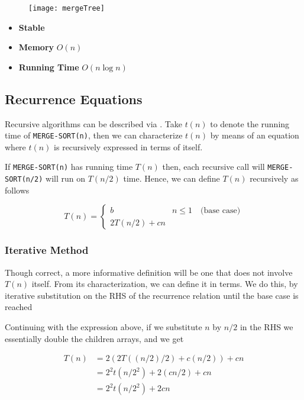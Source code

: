 \begin{figure}[H]
	\texttt{[image: mergeTree]}
\end{figure}

\begin{itemize}
	\item\textbf{Stable}
	\item\textbf{Memory} $O(n)$
	\item\textbf{Running Time} $O(n \log n)$
\end{itemize}

\subsection{Recurrence Equations}


	

\par{Recursive algorithms can be described via . Take
$t(n)$ to denote the  running time of \texttt{MERGE-SORT(n)},
then we can characterize $t(n)$ by means of an equation where $t(n)$ is
recursively expressed in terms of itself.
}
\par{If \texttt{MERGE-SORT(n)} has running time $T(n)$ then, each recursive call
will \texttt{MERGE-SORT(n/2)} will run on $T(n/2)$ time. Hence, we can define
$T(n)$ recursively as follows}

$$ T(n) = \left\{ 
	\begin{array}{ll}
		b & n \leq 1 \quad \text{(base case)} \\
		2T(n/2) + cn 
	\end{array}
\right.
$$
\subsubsection{Iterative Method}
\par{Though correct, a more informative definition will be one that does not
involve $T(n)$ itself. From its  characterization, we can
define it in  terms. We do this, by iterative substitution on the
RHS of the recurrence relation until the base case is reached}
\par{Continuing with the expression above, if we substitute $n$ by $n/2$ in the RHS we
essentially double the children arrays, and we get}

\begin{align*}
	T(n) &= 2(2T((n/2)/2) + c(n/2)) + cn \\
		&= 2^2t(n/2^2) + 2(cn/2) + cn \\
		&= 2^2t(n/2^2) + 2cn
\end{align*}

